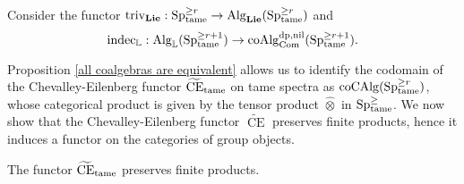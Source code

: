 Consider the functor $\trivial_{\spLie}:\Sp^{\geq r}_{\tame}\to \Alg_{\spLie}(\Sp^{\geq r}_{\tame})$ and $$
\indec_{\BL}:\Alg_{\BL}(\Sp^{\geq r+1}_{\tame})
\to
\coAlg^{\divpow, \nil}_{\Com}(\Sp^{\geq r+1}_{\tame}).
$$



Proposition \ref{all coalgebras are equivalent} allows us to identify the codomain of the Chevalley-Eilenberg functor $\tildeCE_{\tame}$ on tame spectra as $\coCAlg(\Sp^{\geq r}_{\tame})$, whose categorical product is given by the tensor product $\hat{\otimes}$ in $\Sp^{\geq}_{\tame}$.
We now show that the Chevalley-Eilenberg functor $\widetilde{\operatorname{CE}}$ preserves finite products, hence it induces a functor on the categories of group objects.
\begin{lemma}
\label{CE preserves products}
	The functor 
	$\widetilde{\operatorname{CE}}_{\tame}$
	preserves finite products.
\end{lemma}
